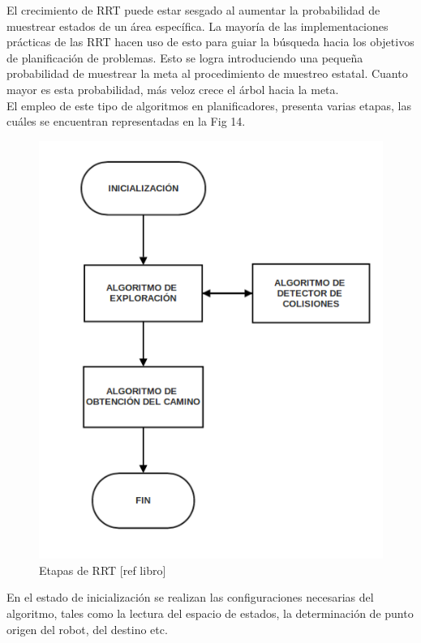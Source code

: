 \documentclass[conference]{IEEEtran}
\begin{document}
{El crecimiento de RRT puede estar sesgado al aumentar la probabilidad de muestrear estados de un área específica. La mayoría de las implementaciones prácticas de las RRT hacen uso de esto para guiar la búsqueda hacia los objetivos de planificación de problemas. Esto se logra introduciendo una pequeña probabilidad de muestrear la meta al procedimiento de muestreo estatal. Cuanto mayor es esta probabilidad, más veloz crece el árbol hacia la meta.\\

El empleo de este tipo de algoritmos en planificadores, presenta varias etapas, las cuáles se encuentran representadas en la Fig 14.

\begin{figure}[H]
\centerline{\includegraphics[scale=0.4]{IMAGENES/flujo.png}}
\caption{Etapas de RRT [ref libro]}
\label{fig}
\end{figure}

En el estado de inicialización se realizan las configuraciones necesarias del algoritmo, tales como la lectura del espacio de estados, la determinación de punto origen del robot, del destino etc.

}
\end{document}
